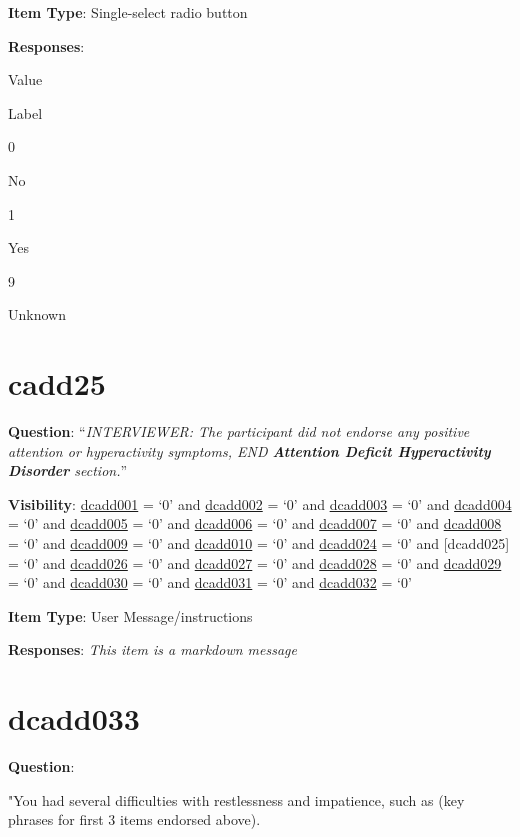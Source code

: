 \documentclass[]{book}
\begin{document}
\textbf{Item Type}: Single-select radio button

\textbf{Responses}:

Value

Label

0

No

1

Yes

9

Unknown

\hypertarget{cadd25}{%
\section{cadd25}\label{cadd25}}

\textbf{Question}: ``\emph{INTERVIEWER: The participant did not endorse any positive attention or hyperactivity symptoms, END \textbf{Attention Deficit Hyperactivity Disorder} section.}''

\textbf{Visibility}: \protect\hyperlink{dcadd001}{dcadd001} = `0' and \protect\hyperlink{dcadd002}{dcadd002} = `0' and \protect\hyperlink{dcadd003}{dcadd003} = `0' and \protect\hyperlink{dcadd004}{dcadd004} = `0' and \protect\hyperlink{dcadd005}{dcadd005} = `0' and \protect\hyperlink{dcadd006}{dcadd006} = `0' and \protect\hyperlink{dcadd007}{dcadd007} = `0' and \protect\hyperlink{dcadd008}{dcadd008} = `0' and \protect\hyperlink{dcadd009}{dcadd009} = `0' and \protect\hyperlink{dcadd010}{dcadd010} = `0' and \protect\hyperlink{dcadd024}{dcadd024} = `0' and {[}dcadd025{]} = `0' and \protect\hyperlink{dcadd026}{dcadd026} = `0' and \protect\hyperlink{dcadd027}{dcadd027} = `0' and \protect\hyperlink{dcadd028}{dcadd028} = `0' and \protect\hyperlink{dcadd029}{dcadd029} = `0' and \protect\hyperlink{dcadd030}{dcadd030} = `0' and \protect\hyperlink{dcadd031}{dcadd031} = `0' and \protect\hyperlink{dcadd032}{dcadd032} = `0'

\textbf{Item Type}: User Message/instructions

\textbf{Responses}: \emph{This item is a markdown message}

\hypertarget{dcadd033}{%
\section{dcadd033}\label{dcadd033}}

\textbf{Question}:

"You had several difficulties with restlessness and impatience, such as (key phrases for first 3 items endorsed above).
\end{document}

